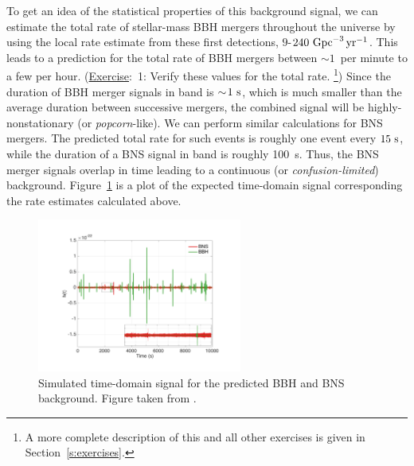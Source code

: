\documentclass[11pt]{article}
\numberwithin{equation}{section}
\def\exer{\underline{Exercise}:\ }
\begin{document}
To get an idea of the statistical properties of this
background signal, we can estimate the total rate of 
stellar-mass BBH mergers throughout the universe by
using the local rate estimate from these first detections,
$9$-$240~{\rm Gpc}^{-3}\,{\rm yr}^{-1}$.
This leads to a prediction for the total rate of 
BBH mergers between $\sim\!1$~per minute to a few per hour.
(\exer 1: Verify these values for the total rate.%
\footnote{A more complete description of this and 
all other exercises is given in Section~\ref{s:exercises}.})
Since the duration of BBH merger signals in band 
is $\sim\!1~{\rm s}$, which is much smaller than the 
average duration between successive mergers, the 
combined signal will be highly-nonstationary (or {\em popcorn}-like).
We can perform similar calculations for BNS mergers.
The predicted total rate for such events is roughly 
one event every $15~{\rm s}$, while the duration of 
a BNS signal in band is roughly 100~{\rm s}. 
Thus, the BNS merger signals overlap in time leading to 
a continuous (or {\em confusion-limited}) background.
Figure~\ref{f:BBH-BNS-timeseries} is a plot of the
expected time-domain signal corresponding the rate
estimates calculated above.
%
\begin{figure}[htbp!]
\begin{center}
\includegraphics[width=0.6\textwidth]{Figures/BBH-BNS-timeseries}
\caption{Simulated time-domain signal for the predicted BBH and 
BNS background.  
Figure taken from \cite{stoch-implications}.}
\label{f:BBH-BNS-timeseries}
\end{center}
\end{figure}
%
\end{document}
